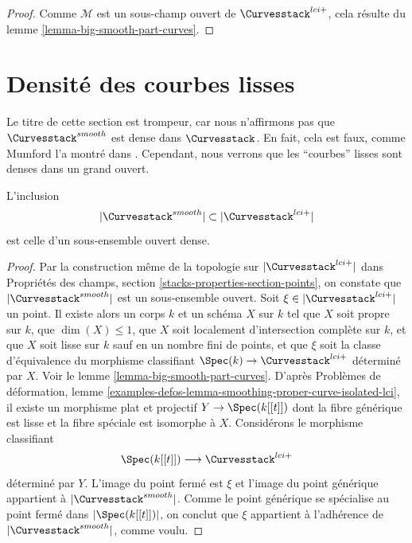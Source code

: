 \begin{proof}
Comme $\mathcal{M}$ est un sous-champ ouvert de
$\Curvesstack^{lci+}$, cela résulte du
lemme \ref{lemma-big-smooth-part-curves}.
\end{proof}





\section{Densité des courbes lisses}
\label{section-smooth-is-dense}

\noindent
Le titre de cette section est trompeur, car nous n'affirmons pas que
$\Curvesstack^{smooth}$ est dense dans $\Curvesstack$.
En fait, cela est faux, comme Mumford l'a montré dans \cite{PathologiesIV}.
Cependant, nous verrons que les ``courbes'' lisses sont denses
dans un grand ouvert.

\begin{lemma}
\label{lemma-smooth-dense}
L'inclusion
$$
|\Curvesstack^{smooth}| \subset |\Curvesstack^{lci+}|
$$
est celle d'un sous-ensemble ouvert dense.
\end{lemma}

\begin{proof}
Par la construction même de la topologie sur
$|\Curvesstack^{lci+}|$ dans
Propriétés des champs, section \ref{stacks-properties-section-points},
on constate que $|\Curvesstack^{smooth}|$
est un sous-ensemble ouvert. Soit $\xi \in |\Curvesstack^{lci+}|$ un point.
Il existe alors un corps $k$ et un schéma $X$ sur $k$
tel que $X$ soit propre sur $k$, que $\dim(X) \leq 1$,
que $X$ soit localement d'intersection complète sur $k$, et
que $X$ soit lisse sur $k$ sauf en un nombre fini de points, et
que $\xi$ soit la classe d'équivalence du
morphisme classifiant $\Spec(k) \to \Curvesstack^{lci+}$ déterminé par $X$.
Voir le lemme \ref{lemma-big-smooth-part-curves}.
D'après Problèmes de déformation, lemme
\ref{examples-defos-lemma-smoothing-proper-curve-isolated-lci},
il existe un morphisme plat et projectif $Y \to \Spec(k[[t]])$
dont la fibre générique est lisse et la fibre spéciale est
isomorphe à $X$. Considérons le morphisme classifiant
$$
\Spec(k[[t]]) \longrightarrow \Curvesstack^{lci+}
$$
déterminé par $Y$. L'image du point fermé est $\xi$
et l'image du point générique appartient à $|\Curvesstack^{smooth}|$.
Comme le point générique se spécialise au point fermé dans
$|\Spec(k[[t]])|$, on conclut que $\xi$ appartient à l'adhérence
de $|\Curvesstack^{smooth}|$, comme voulu.
\end{proof}






